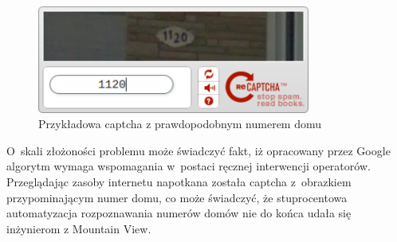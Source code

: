 \begin{figure}[h!]
    \centering
    \includegraphics[width=0.8\textwidth]{img/rev_captcha_street_view}
    \caption{Przykładowa captcha z prawdopodobnym numerem domu}
\end{figure}

O~skali złożoności problemu może świadczyć fakt, iż
opracowany przez Google algorytm wymaga wspomagania w~postaci 
ręcznej interwencji
operatorów. Przeglądając zasoby internetu napotkana została captcha
z~obrazkiem przypominającym numer domu, co może świadczyć, że stuprocentowa
automatyzacja rozpoznawania numerów domów nie do końca udała się inżynierom
z Mountain View.

